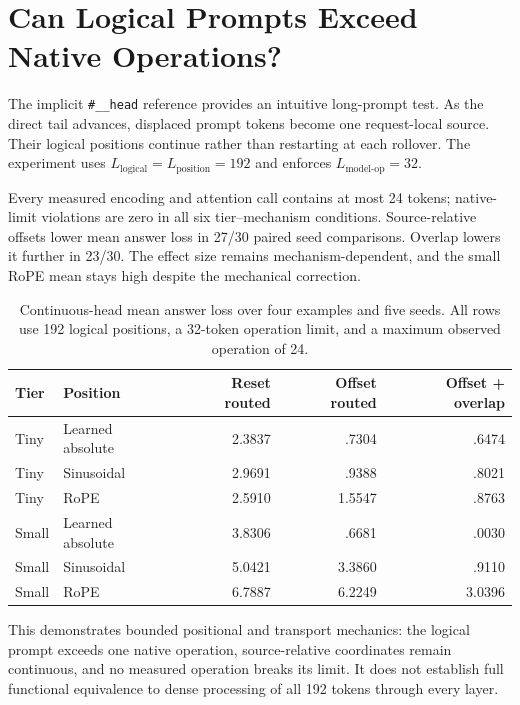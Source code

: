 \documentclass[11pt]{article}
\begin{document}
\section{Can Logical Prompts Exceed Native Operations?}
\label{sec:head}

The implicit \texttt{\#\_\_head} reference provides an intuitive long-prompt test. As the
direct tail advances, displaced prompt tokens become one request-local source. Their logical
positions continue rather than restarting at each rollover. The experiment uses
$L_{\mathrm{logical}}=L_{\mathrm{position}}=192$ and enforces
$L_{\mathrm{model\mbox{-}op}}=32$.

Every measured encoding and attention call contains at most 24 tokens; native-limit
violations are zero in all six tier--mechanism conditions. Source-relative offsets lower mean
answer loss in 27/30 paired seed comparisons. Overlap lowers it further in 23/30. The effect
size remains mechanism-dependent, and the small RoPE mean stays high despite the mechanical
correction.

\begin{table}[H]
\centering
\small
\caption{Continuous-head mean answer loss over four examples and five seeds. All rows use
192 logical positions, a 32-token operation limit, and a maximum observed operation of 24.}
\label{tab:head-summary}
\begin{tabular}{llrrr}
\toprule
Tier & Position & Reset routed & Offset routed & Offset + overlap \\
\midrule
Tiny & Learned absolute & 2.3837 & .7304 & .6474 \\
Tiny & Sinusoidal       & 2.9691 & .9388 & .8021 \\
Tiny & RoPE             & 2.5910 & 1.5547 & .8763 \\
Small & Learned absolute& 3.8306 & .6681 & .0030 \\
Small & Sinusoidal      & 5.0421 & 3.3860 & .9110 \\
Small & RoPE            & 6.7887 & 6.2249 & 3.0396 \\
\bottomrule
\end{tabular}
\end{table}

This demonstrates bounded positional and transport mechanics: the logical prompt exceeds one
native operation, source-relative coordinates remain continuous, and no measured operation
breaks its limit. It does not establish full functional equivalence to dense processing of all
192 tokens through every layer.
\end{document}
